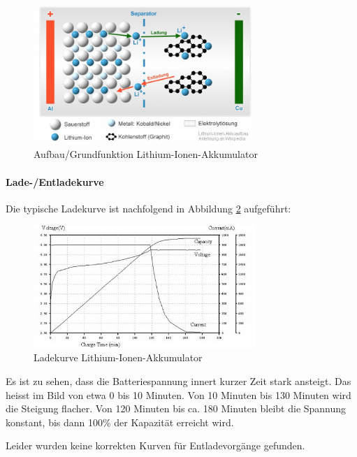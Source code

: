 \begin{figure}
\centering
\includegraphics[width=0.75\textwidth]{images/aufbau_liion.jpg}
	\caption{Aufbau/Grundfunktion Lithium-Ionen-Akkumulator \cite{liion_akku_aufbau_funktion1}}
	\label{fig:liion_akku}
\end{figure}

\paragraph{Lade-/Entladekurve}

Die typische Ladekurve ist nachfolgend in Abbildung \ref{fig:liion_akku_kurve} aufgeführt:

\begin{figure}
\centering
\includegraphics[width=0.75\textwidth]{images/liion_laden.jpg}
	\caption{Ladekurve Lithium-Ionen-Akkumulator \cite{liion_kurve}}
	\label{fig:liion_akku_kurve}
\end{figure}

Es ist zu sehen, dass die Batteriespannung innert kurzer Zeit stark ansteigt. Das heisst im Bild von etwa 0 bis 10 Minuten. Von 10 Minuten bis 130 Minuten wird die Steigung flacher. Von 120 Minuten bis ca. 180 Minuten bleibt die Spannung konstant, bis dann 100\% der Kapazität erreicht wird.

Leider wurden keine korrekten Kurven für Entladevorgänge gefunden. 

